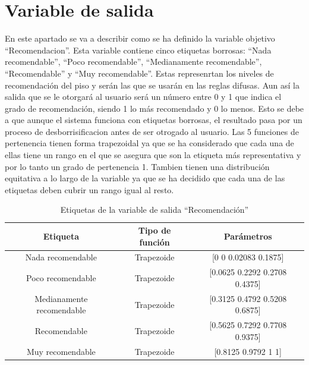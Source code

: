 \documentclass[12pt]{report} %
\begin{document}
    \section{Variable de salida}
    En este apartado se va a describir como se ha definido la variable objetivo
    ``Recomendacion''. Esta variable contiene cinco etiquetas borrosas: ``Nada
    recomendable'', ``Poco recomendable'', ``Medianamente recomendable'',
    ``Recomendable'' y ``Muy recomendable''. Estas represenrtan los niveles de
    recomendación del piso y serán las que se usarán en las reglas difusas. Aun
    así la salida que se le otorgará al usuario será un número entre 0 y 1 que
    indica el grado de recomendación, siendo 1 lo más recomendado y 0 lo menos.
    Esto se debe a que aunque el sistema funciona con etiquetas borrosas, el
    resultado pasa por un proceso de desborrisificacion antes de ser otrogado al
    usuario. Las 5 funciones de pertenencia tienen forma trapezoidal ya que se
    ha considerado que cada una de ellas tiene un rango en el que se asegura que
    son la etiqueta más representativa y por lo tanto un grado de pertenencia 1.
    Tambien tienen una distribución equitativa a lo largo de la variable ya que
    se ha decidido que cada una de las etiquetas deben cubrir un rango igual al
    resto.

    \begin{table}[h]
        \center
        \begin{tabular}{@{}ccc@{}}
            \toprule
            \textbf{Etiqueta} & \textbf{Tipo de función} & \textbf{Parámetros} \\
            \midrule
            Nada recomendable         & Trapezoide & [0 0 0.02083 0.1875] \\
            Poco recomendable         & Trapezoide & [0.0625 0.2292 0.2708 0.4375] \\
            Medianamente recomendable & Trapezoide & [0.3125 0.4792 0.5208 0.6875] \\
            Recomendable              & Trapezoide & [0.5625 0.7292 0.7708 0.9375] \\
            Muy recomendable          & Trapezoide & [0.8125 0.9792 1 1]   \\
            \bottomrule
        \end{tabular}
        \caption{Etiquetas de la variable de salida ``Recomendación''}
    \end{table}
\end{document}
